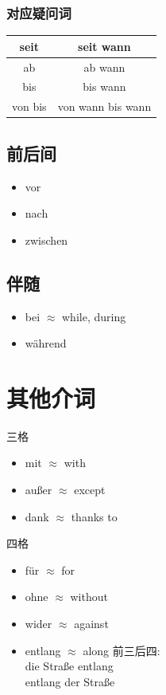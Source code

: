 \subsubsection{对应疑问词}
\begin{center}
    \begin{tabular}{|c|c|}
        \hline
        \rowcolor{gray}
        \hline
        seit    & seit wann         \\
        \hline
        ab      & ab wann           \\
        \hline
        bis     & bis wann          \\
        \hline
        von bis & von wann bis wann \\
        \hline
    \end{tabular}
\end{center}


\subsection{前后间}
\begin{itemize}
    \item vor
    \item nach
    \item zwischen
\end{itemize}

\subsection{伴随}
\begin{itemize}
    \item bei $\approx$ while, during
    \item während
\end{itemize}

\section{其他介词}

三格
\begin{itemize}
    \item mit $\approx$ with \olive[border=true]
    \item außer $\approx$ except \olive[border=true]
    \item dank $\approx$ thanks to \olive[border=true]
\end{itemize}

四格
\begin{itemize}
    \item für $\approx$ for \diam[border=true]
    \item ohne $\approx$ without \diam[border=true]
    \item wider $\approx$ against \diam[border=true]    \item entlang $\approx$ along 前三后四: \\
          die Straße entlang \\
          entlang der Straße
\end{itemize}

